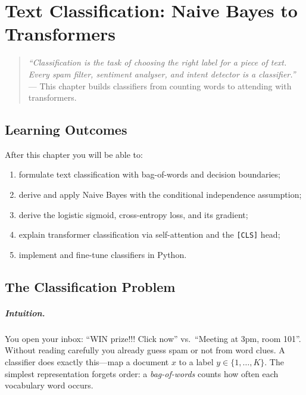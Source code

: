 \chapter{Text Classification: Naive Bayes to Transformers}
\label{ch:classification}

\begin{quote}
\emph{``Classification is the task of choosing the right label for a piece of text. Every spam filter, sentiment analyser, and intent detector is a classifier.''} --- This chapter builds classifiers from counting words to attending with transformers.
\end{quote}

\noindent{}
\vspace{0.4em}

\section*{Learning Outcomes}
After this chapter you will be able to:
\begin{enumerate}[label=(L\arabic*)]
    \item formulate text classification with bag-of-words and decision boundaries;
    \item derive and apply Naive Bayes with the conditional independence assumption;
    \item derive the logistic sigmoid, cross-entropy loss, and its gradient;
    \item explain transformer classification via self-attention and the \texttt{[CLS]} head;
    \item implement and fine-tune classifiers in Python.
\end{enumerate}

\section{The Classification Problem}
\label{sec:classification-problem}
\paragraph{Intuition.} You open your inbox: ``WIN prize!!! Click now'' vs.\ ``Meeting at 3pm, room 101''. Without reading carefully you already guess spam or not from word clues. A classifier does exactly this---map a document $x$ to a label $y\in\{1,\dots,K\}$. The simplest representation forgets order: a \emph{bag-of-words} counts how often each vocabulary word occurs.


